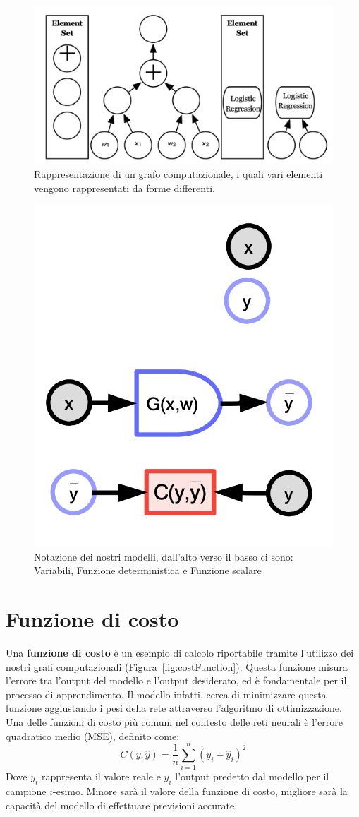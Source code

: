 \begin{figure}
    \centering
    \includegraphics[width=0.75\linewidth]{figure/ComputationalGraph.png}
    \caption{Rappresentazione di un grafo computazionale, i quali vari elementi vengono rappresentati da forme differenti.}
    \label{fig:computationalG}
\end{figure}
\begin{figure}
    \centering
    \includegraphics[width=0.40\linewidth]{figure/ParametriModel.png}
    \caption{Notazione dei nostri modelli, dall'alto verso il basso ci sono: Variabili, Funzione deterministica e Funzione scalare}
    \label{fig:parModel}
\end{figure}

\section{Funzione di costo}
Una \textbf{funzione di costo} è un esempio di calcolo riportabile tramite l'utilizzo dei nostri grafi computazionali (Figura~\ref{fig:costFunction}). Questa funzione misura l'errore tra l'output del modello e l'output desiderato, ed è fondamentale per il processo di apprendimento. Il modello infatti, cerca di minimizzare questa funzione aggiustando i pesi della rete attraverso l'algoritmo di ottimizzazione. Una delle funzioni di costo più comuni nel contesto delle reti neurali è l'errore quadratico medio (MSE), definito come:
\begin{equation}
    C(y, \hat{y}) = \frac{1}{n} \sum_{i=1}^{n} (y_i - \hat{y}_i)^2
\end{equation}
Dove $y_i$ rappresenta il valore reale e $\hat{y}_i$ l'output predetto dal modello per il campione $i$-esimo. Minore sarà il valore della funzione di costo, migliore sarà la capacità del modello di effettuare previsioni accurate.

